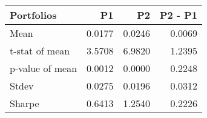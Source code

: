 \begin{tabular}{lrrr}
\toprule
Portfolios & P1 & P2 & P2 - P1 \\
\midrule
Mean & 0.0177 & 0.0246 & 0.0069 \\
t-stat of mean & 3.5708 & 6.9820 & 1.2395 \\
p-value of mean & 0.0012 & 0.0000 & 0.2248 \\
Stdev & 0.0275 & 0.0196 & 0.0312 \\
Sharpe & 0.6413 & 1.2540 & 0.2226 \\
\bottomrule
\end{tabular}
